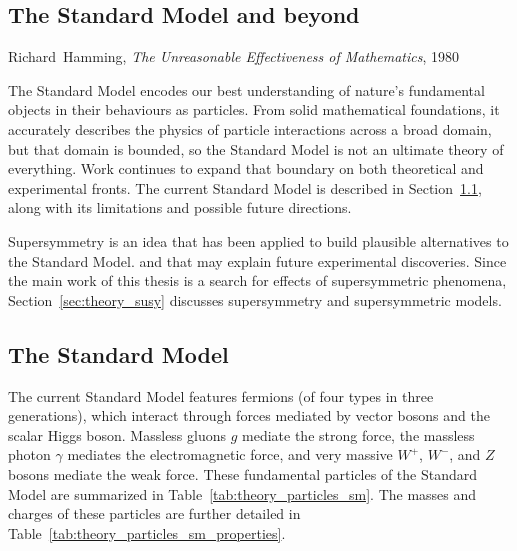 \begin{singlespacing}
\chapter{The Standard Model and beyond}
\label{chapter:theory}
%
\begin{epigraphs}
%
{Richard~Hamming,
\textit{The Unreasonable Effectiveness of Mathematics},
1980~\cite{hamming1980unreasonable}}
\end{epigraphs}
\end{singlespacing}
\noindent
The Standard Model encodes our best understanding of nature's fundamental
objects in their behaviours as particles.
From solid mathematical foundations, it accurately describes the physics
of particle interactions across a broad domain,
but that domain is bounded, so the Standard Model is not an ultimate theory of
everything.
Work continues to expand that boundary on both theoretical and experimental
fronts.
The current Standard Model is described in Section~\ref{sec:theory_sm},
along with its limitations and possible future directions.

Supersymmetry is an idea that has been applied to build plausible alternatives
to the Standard Model. and that may explain future experimental discoveries.
Since the main work of this thesis is a search for effects of supersymmetric
phenomena, Section~\ref{sec:theory_susy} discusses supersymmetry and
supersymmetric models.


\section{The Standard Model}
\label{sec:theory_sm}
The current Standard Model features fermions
(of four types in three generations),
which interact through forces mediated by vector bosons
and the scalar Higgs boson.
Massless gluons $g$ mediate the strong force,
the massless photon $\gamma$ mediates the electromagnetic force,
and very massive $W^+$, $W^-$, and $Z$ bosons mediate the weak force.
These fundamental particles of the Standard Model are summarized in
Table~\ref{tab:theory_particles_sm}.
The masses and charges of these particles are further detailed in
Table~\ref{tab:theory_particles_sm_properties}.

